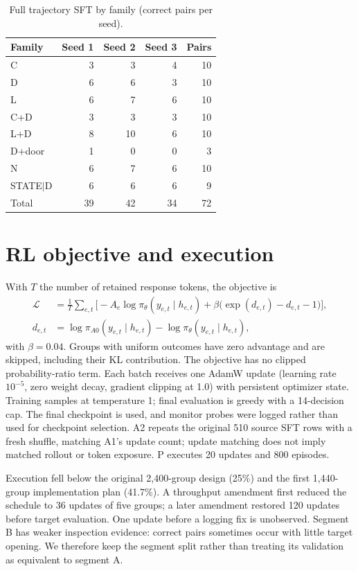 \documentclass{article}
\begin{document}
\begin{table}[htbp]
\centering
\caption{Full trajectory SFT by family (correct pairs per seed).}
\label{tab:families_sft}
\begin{tabular}{lrrrr}
\toprule
Family & Seed 1 & Seed 2 & Seed 3 & Pairs \\
\midrule
C & 3 & 3 & 4 & 10 \\
D & 6 & 6 & 3 & 10 \\
L & 6 & 7 & 6 & 10 \\
C+D & 3 & 3 & 3 & 10 \\
L+D & 8 & 10 & 6 & 10 \\
D+door & 1 & 0 & 0 & 3 \\
N & 6 & 7 & 6 & 10 \\
STATE$|$D & 6 & 6 & 6 & 9 \\
\midrule
Total & 39 & 42 & 34 & 72 \\
\bottomrule
\end{tabular}
\end{table}

\section{RL objective and execution}
\label{app:rl}
With $T$ the number of retained response tokens, the objective is
\begin{align}
\mathcal{L} &= \frac{1}{T}\sum_{e,t}\Big[-A_e\log\pi_\theta(y_{e,t}\mid h_{e,t}) + \beta\big(\exp(d_{e,t}) - d_{e,t} - 1\big)\Big],\\
d_{e,t} &= \log\pi_{A0}(y_{e,t}\mid h_{e,t}) - \log\pi_\theta(y_{e,t}\mid h_{e,t}),
\end{align}
with $\beta = 0.04$. Groups with uniform outcomes have zero advantage and are skipped, including their KL contribution. The objective has no clipped probability-ratio term. Each batch receives one AdamW update (learning rate $10^{-5}$, zero weight decay, gradient clipping at 1.0) with persistent optimizer state. Training samples at temperature 1; final evaluation is greedy with a 14-decision cap. The final checkpoint is used, and monitor probes were logged rather than used for checkpoint selection. A2 repeats the original 510 source SFT rows with a fresh shuffle, matching A1's update count; update matching does not imply matched rollout or token exposure. P executes 20 updates and 800 episodes.

Execution fell below the original 2,400-group design (25\%) and the first 1,440-group implementation plan (41.7\%). A throughput amendment first reduced the schedule to 36 updates of five groups; a later amendment restored 120 updates before target evaluation. One update before a logging fix is unobserved. Segment B has weaker inspection evidence: correct pairs sometimes occur with little target opening. We therefore keep the segment split rather than treating its validation as equivalent to segment A.
\end{document}
